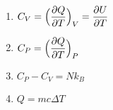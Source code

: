 

\vspace*{\fill}
\centering

\begin{enumerate}
    \item $\displaystyle C_{V} = \Big(\pdv{Q}{T}\Big)_{V} = \pdv{U}{T}$ 
    \item $\displaystyle C_{P} = \Big(\pdv{Q}{T}\Big)_{P}$
    \item $\displaystyle C_{P} - C_{V} = Nk_{B}$
    \item $\displaystyle Q = mc\Delta T$
\end{enumerate}

\centering
\vspace*{\fill}

